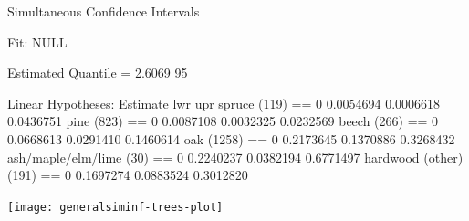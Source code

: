 \documentclass[landscape]{slides}
\begin{document}
\begin{Schunk}
\begin{Soutput}
	 Simultaneous Confidence Intervals

Fit: NULL

Estimated Quantile = 2.6069
95%
 

Linear Hypotheses:
                             Estimate  lwr       upr      
spruce (119) == 0            0.0054694 0.0006618 0.0436751
pine (823) == 0              0.0087108 0.0032325 0.0232569
beech (266) == 0             0.0668613 0.0291410 0.1460614
oak (1258) == 0              0.2173645 0.1370886 0.3268432
ash/maple/elm/lime (30) == 0 0.2240237 0.0382194 0.6771497
hardwood (other) (191) == 0  0.1697274 0.0883524 0.3012820
\end{Soutput}
\end{Schunk}


\begin{center}
\texttt{[image: generalsiminf-trees-plot]}
\end{center}

\end{document}
